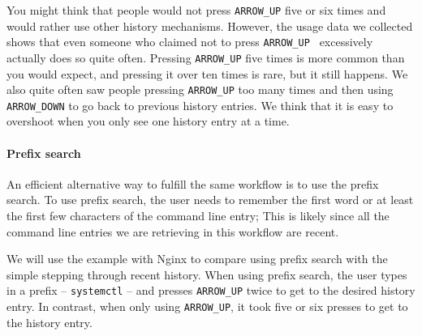 
You might think that people would not press \verb|ARROW_UP| five or six times and would rather use other history mechanisms.
However, the usage data we collected shows that even someone who claimed not to press \verb|ARROW_UP | excessively actually does so quite often. Pressing \verb|ARROW_UP| five times is more common than you would expect, and pressing it over ten times is rare, but it still happens. We also quite often saw people pressing \verb|ARROW_UP| too many times and then using \verb|ARROW_DOWN| to go back to previous history entries. We think that it is easy to overshoot when you only see one history entry at a time.




\paragraph{Prefix search}

An efficient alternative way to fulfill the same workflow is to use the prefix search. To use prefix search, the user needs to remember the first word or at least the first few characters of the command line entry; This is likely since all the command line entries we are retrieving in this workflow are recent.

We will use the example with Nginx to compare using prefix search with the simple stepping through recent history. When using prefix search, the user types in a prefix -- \verb|systemctl| -- and presses \verb|ARROW_UP| twice to get to the desired history entry. In contrast, when only using \verb|ARROW_UP|, it took five or six presses to get to the history entry.


